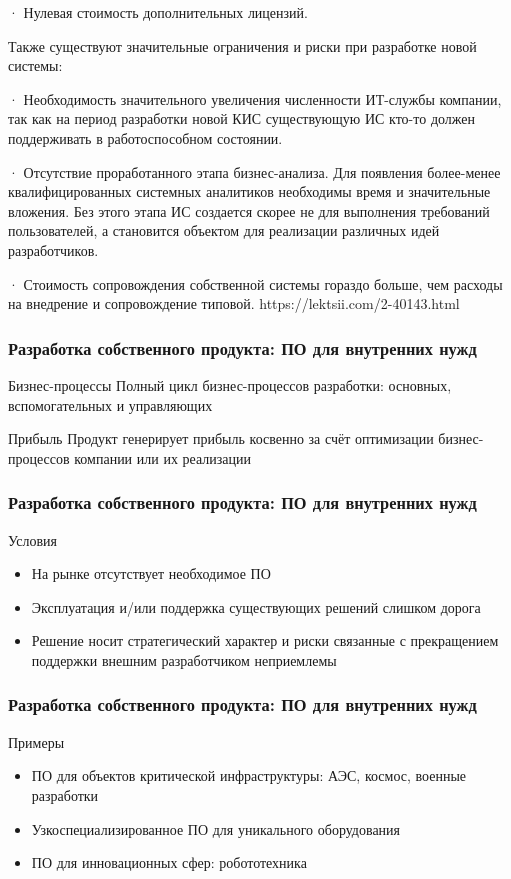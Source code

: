 \documentclass{../industrial-development}
\begin{document}
· Нулевая стоимость дополнительных лицензий.

Также существуют значительные ограничения и риски при разработке новой системы:

· Необходимость значительного увеличения численности ИТ-службы компании, так как на период разработки новой КИС существующую ИС кто-то должен поддерживать в работоспособном состоянии.

· Отсутствие проработанного этапа бизнес-анализа. Для появления более-менее квалифицированных системных аналитиков необходимы время и значительные вложения. Без этого этапа ИС создается скорее не для выполнения требований пользователей, а становится объектом для реализации различных идей разработчиков.

· Стоимость сопровождения собственной системы гораздо больше, чем расходы на внедрение и сопровождение типовой.
https://lektsii.com/2-40143.html


\begin{frame} \frametitle{Разработка собственного продукта: ПО для внутренних нужд}
	\begin{block}{Бизнес-процессы}
		Полный цикл бизнес-процессов разработки: основных, вспомогательных и управляющих
	\end{block}
	\begin{block}{Прибыль}
		Продукт генерирует прибыль косвенно за счёт оптимизации бизнес-процессов компании или их реализации
	\end{block}
\end{frame}
\lecturenotes


\begin{frame} \frametitle{Разработка собственного продукта: ПО для внутренних нужд}
	\begin{block}{Условия}
		\begin{itemize}
			\item На рынке отсутствует необходимое ПО
			\item Эксплуатация и/или поддержка существующих решений слишком дорога
			\item Решение носит стратегический характер и риски связанные с прекращением поддержки внешним разработчиком неприемлемы
		\end{itemize}
	\end{block}
\end{frame}
\lecturenotes


\begin{frame} \frametitle{Разработка собственного продукта: ПО для внутренних нужд}
	\begin{block}{Примеры}
		\begin{itemize}
			\item ПО для объектов критической инфраструктуры: АЭС, космос, военные разработки
			\item Узкоспециализированное ПО для уникального оборудования
			\item ПО для инновационных сфер: робототехника
		\end{itemize}
	\end{block}
\end{frame}
\lecturenotes
\end{document}
